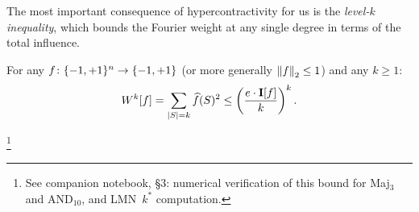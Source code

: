 The most important consequence of hypercontractivity for us is the
\emph{level-$k$ inequality}, which bounds the Fourier weight at any
single degree in terms of the total influence.

\begin{theorem}\label{thm:level-k}
For any $f \colon \{-1,+1\}^n \to \{-1,+1\}$ (or more generally $\left\| f \right\|_2 \leq 1$)
and any $k \geq 1$:
\begin{equation}\label{eq:level-k}
  W^k[f] = \sum_{|S|=k} \widehat{f}(S)^2 \leq \left(\frac{e \cdot \mathbf{I}[f]}{k}\right)^k.
\end{equation}
\end{theorem}%
\footnote{See companion notebook, \S3: numerical verification of this
bound for Maj$_3$ and AND$_{10}$, and LMN~$k^*$ computation.}

